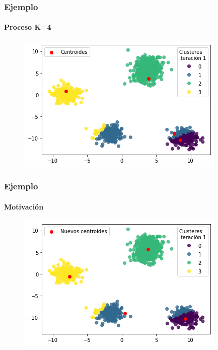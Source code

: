 \documentclass[
  shownotes,
  xcolor={svgnames},
  hyperref={colorlinks,citecolor=DarkBlue,linkcolor=DarkRed,urlcolor=DarkBlue}
  , aspectratio=169]{beamer}
\begin{document}
\begin{frame}
\frametitle{Ejemplo}
\framesubtitle{Proceso K=4}


\begin{figure}[H] \centering

    \centering
    \includegraphics[scale=.7]{figures/output_12_0.png}
  \\
  \tiny
\end{figure}

\end{frame}
\begin{frame}
\frametitle{Ejemplo}
\framesubtitle{Motivación}


\begin{figure}[H] \centering

    \centering
    \includegraphics[scale=.7]{figures/output_16_0.png}
  \\
  \tiny
\end{figure}


\end{frame}
\end{document}
